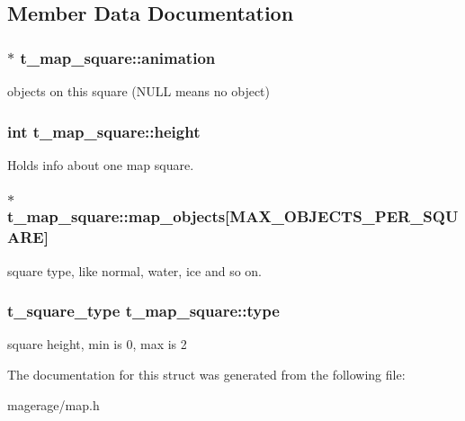 \subsection{Member Data Documentation}
\hypertarget{structt__map__square_a501ddc8f612fc58041bd1c7a11920a15}{
\subsubsection[{animation}]{$\ast$ t\-\_\-map\-\_\-square\-::animation}}\label{structt__map__square_a501ddc8f612fc58041bd1c7a11920a15}
objects on this square (N\-U\-L\-L means no object) \hypertarget{structt__map__square_ad50f073f7cca47229656374c22daa9f8}{
\subsubsection[{height}]{\setlength{\rightskip}{0pt plus 5cm}int t\-\_\-map\-\_\-square\-::height}}\label{structt__map__square_ad50f073f7cca47229656374c22daa9f8}
Holds info about one map square. \hypertarget{structt__map__square_ac2715b549f3b3fb05bfb9b436d5cfc2d}{
\subsubsection[{map\-\_\-objects}]{$\ast$ t\-\_\-map\-\_\-square\-::map\-\_\-objects\mbox{[}M\-A\-X\-\_\-\-O\-B\-J\-E\-C\-T\-S\-\_\-\-P\-E\-R\-\_\-\-S\-Q\-U\-A\-R\-E\mbox{]}}}\label{structt__map__square_ac2715b549f3b3fb05bfb9b436d5cfc2d}
square type, like normal, water, ice and so on. \hypertarget{structt__map__square_af17b226474485e797d61cce54a409666}{
\subsubsection[{type}]{\setlength{\rightskip}{0pt plus 5cm}t\-\_\-square\-\_\-type t\-\_\-map\-\_\-square\-::type}}\label{structt__map__square_af17b226474485e797d61cce54a409666}
square height, min is 0, max is 2 

The documentation for this struct was generated from the following file\-:\begin{DoxyCompactItemize}
\item 
magerage/map.\-h\end{DoxyCompactItemize}
